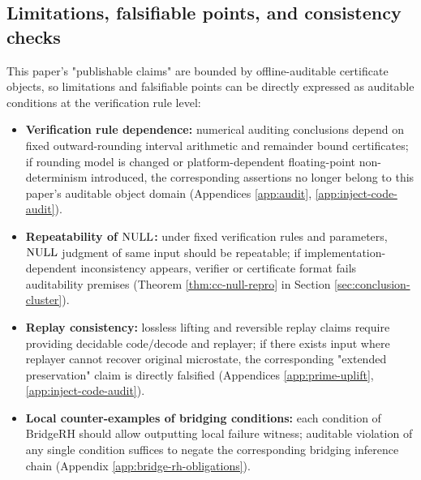 \subsection{Limitations, falsifiable points, and consistency checks}
This paper's "publishable claims" are bounded by offline-auditable certificate objects, so limitations and falsifiable points can be directly expressed as auditable conditions at the verification rule level:
\begin{itemize}
  \item \textbf{Verification rule dependence:} numerical auditing conclusions depend on fixed outward-rounding interval arithmetic and remainder bound certificates; if rounding model is changed or platform-dependent floating-point non-determinism introduced, the corresponding assertions no longer belong to this paper's auditable object domain (Appendices \ref{app:audit}, \ref{app:inject-code-audit}).\par
  \item \textbf{Repeatability of $\mathrm{NULL}$:} under fixed verification rules and parameters, $\mathrm{NULL}$ judgment of same input should be repeatable; if implementation-dependent inconsistency appears, verifier or certificate format fails auditability premises (Theorem \ref{thm:cc-null-repro} in Section \ref{sec:conclusion-cluster}).\par
  \item \textbf{Replay consistency:} lossless lifting and reversible replay claims require providing decidable $\mathrm{code}/\mathrm{decode}$ and replayer; if there exists input where replayer cannot recover original microstate, the corresponding "extended preservation" claim is directly falsified (Appendices \ref{app:prime-uplift}, \ref{app:inject-code-audit}).\par
  \item \textbf{Local counter-examples of bridging conditions:} each condition of BridgeRH should allow outputting local failure witness; auditable violation of any single condition suffices to negate the corresponding bridging inference chain (Appendix \ref{app:bridge-rh-obligations}).\par
\end{itemize}

